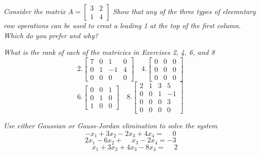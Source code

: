 \documentclass[12pt,letterpaper]{hmcpset}
\begin{document}
\begin{solution}

\end{solution}

\newpage

\begin{problem}[2.2.22]
\textit{ Consider the matrix $ A= \begin{bmatrix}
3&2\\1&4
\end{bmatrix}$ Show that any of the three types of eleemntary row operations can be used to creat a leading 1 at the top of the first column. Which do you prefer and why? }
\end{problem}

\begin{solution}

\end{solution}

\newpage

\begin{problem}[2.2.23]
\textit{What is the rank of each of the matricies in Exercises 2, 4, 6, and 8}
$$ 2. \begin{bmatrix}
7&0&1&0\\0&1&-1&4\\0&0&0&0
\end{bmatrix}
\quad
4.\begin{bmatrix}
	0&0&0\\
	0&0&0\\
	0&0&0
\end{bmatrix}
$$
$$ 6.\begin{bmatrix}
	0&0&1\\
	0&1&0\\
	1&0&0
\end{bmatrix}
\quad
8.  \begin{bmatrix}
2&1&3&5\\0&0&1&-1\\0&0&0&3\\0&0&0&0
\end{bmatrix}
$$
\end{problem}

\begin{solution}

\end{solution}

\newpage

\begin{problem}[2.2.30]
\textit{Use either Gaussian or Gauss-Jordan elimination to solve the system} 
$$ -x_1+3x_2-2x_3+4x_4 = \phantom-0$$
$$2x_1-6x_2+ \phantom-x_3-2x_4 = -3$$
$$ \phantom-x_1+3x_2+4x_3-8x_4 = \phantom-2$$
\end{problem}
\end{document}
